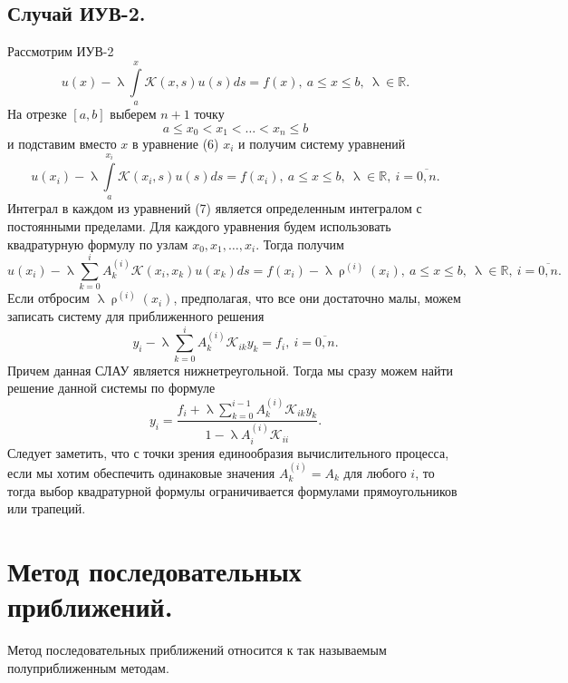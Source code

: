 \documentclass[a4paper, 12pt]{report}
\numberwithin{equation}{section}
\newcommand{\Rm}{\mathbb{R}}
\renewcommand{\leq}{\leqslant}
\renewcommand{\lambda}{\uplambda}
\renewcommand{\rho}{\uprho}
\begin{document}
 	\subsection{Случай ИУВ-2.}
 	Рассмотрим ИУВ-2 \begin{equation}
 		u(x) - \lambda \int\limits_a^x \mathcal K(x,s)u(s)ds = f(x),\ a\leq x \leq b,\ \lambda \in \Rm.
 	\end{equation}
 	На отрезке $[a,b]$ выберем $n+1$ точку $$a \leq x_0 < x_1 <\ldots < x_n \leq b$$ и подставим вместо $x$ в уравнение (6) $x_i$ и получим систему уравнений
 	\begin{equation}
 		u(x_i) - \lambda \int\limits_a^{x_i} \mathcal K(x_i,s)u(s)ds = f(x_i),\ a\leq x \leq b,\ \lambda \in \Rm,\ i = \overline{0,n}.
 	\end{equation}
 	Интеграл в каждом из уравнений (7) является определенным интегралом с постоянными пределами. Для каждого уравнения будем использовать квадратурную формулу по узлам $x_0, x_1,\ldots, x_i$. Тогда получим 
 	\begin{equation}
 		u(x_i) - \lambda \sum_{k=0}^i A_k^{(i)} \mathcal K(x_i,x_k)u(x_k)ds = f(x_i) - \lambda \rho^{(i)}(x_i),\ a\leq x \leq b,\ \lambda \in \Rm,\ i = \overline{0,n}.
 	\end{equation}
 	Если отбросим $ \lambda \rho^{(i)}(x_i)$, предполагая, что все они достаточно малы, можем записать систему для приближенного решения 
 	\begin{equation}
 		y_i - \lambda\sum_{k=0}^i A_k^{(i)}\mathcal K_{ik}y_k = f_i,\ i = \overline{0,n}.
 	\end{equation}
 	Причем данная СЛАУ является нижнетреугольной. Тогда мы сразу можем найти решение данной системы по формуле \begin{equation}
 		y_i = \dfrac{f_i+\lambda\sum\limits_{k=0}^{i-1} A_k^{(i)}\mathcal K_{ik}y_k}{1-\lambda A_{i}^{(i)}\mathcal K_{ii}}.
 	\end{equation}
 	Следует заметить, что с точки зрения единообразия вычислительного процесса, если мы хотим обеспечить одинаковые значения $A^{(i)}_k = A_k$ для любого $i$, то тогда выбор квадратурной формулы ограничивается формулами прямоугольников или трапеций.
 	\section{Метод последовательных приближений.}
 	Метод последовательных приближений относится к так называемым полуприближенным методам.
\end{document}
